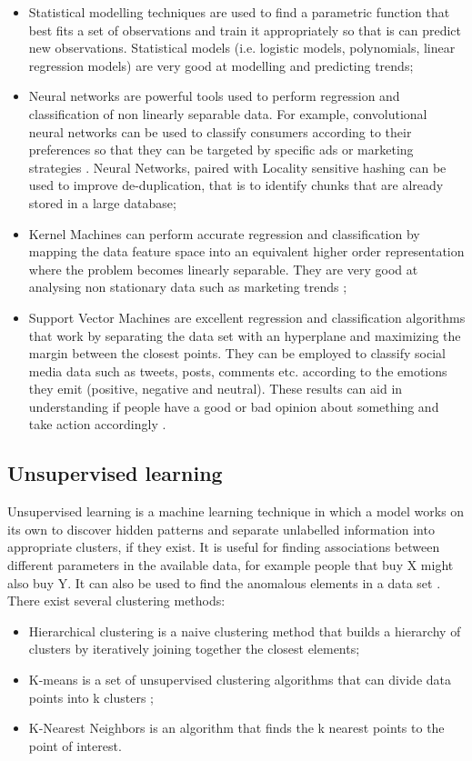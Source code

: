 \begin{itemize} 
	\item Statistical modelling techniques are used to find a parametric function that best fits a set of observations and train it appropriately so that is can predict new observations. Statistical models (i.e. logistic models, polynomials, linear regression models) are very good at modelling and predicting trends;
	\item Neural networks are powerful tools used to perform regression and classification of non linearly separable data. For example, convolutional neural networks can be used to classify consumers according to their preferences so that they can be targeted by specific ads or marketing strategies \cite{socialtrends}. Neural Networks, paired with Locality sensitive hashing \cite{lsh} can be used to improve de-duplication, that is to identify chunks that are already stored in a large database;
	\item Kernel Machines can perform accurate regression and classification by mapping the data feature space into an equivalent higher order representation where the problem becomes linearly separable. They are very good at analysing non stationary data such as marketing trends \cite{onlineregressionkernels};
	\item Support Vector Machines are excellent regression and classification algorithms that work by separating the data set with an hyperplane and maximizing the margin between the closest points. They can be employed to classify social media data such as tweets, posts, comments etc. according to the emotions they emit (positive, negative and neutral). These results can aid in understanding if people have a good or bad opinion about something and take action accordingly \cite{sentimentanalysis}.
\end{itemize}  


\subsection{Unsupervised learning}
Unsupervised learning is a machine learning technique in which a model works on its own to discover hidden patterns and separate unlabelled information into appropriate clusters, if they exist. It is useful for finding associations between different parameters in the available data, for example people that buy X might also buy Y. It can also be used to find the anomalous elements in a data set \cite{kmeans}. There exist several clustering methods:
\begin{itemize} 
	\item Hierarchical clustering is a naive clustering method that builds a hierarchy of clusters by iteratively joining together the closest elements;
	\item K-means is a set of unsupervised clustering algorithms that can divide data points into k clusters  \cite{kmeans};
	\item K-Nearest Neighbors is an algorithm that finds the k nearest points to the point of interest.
\end{itemize}


